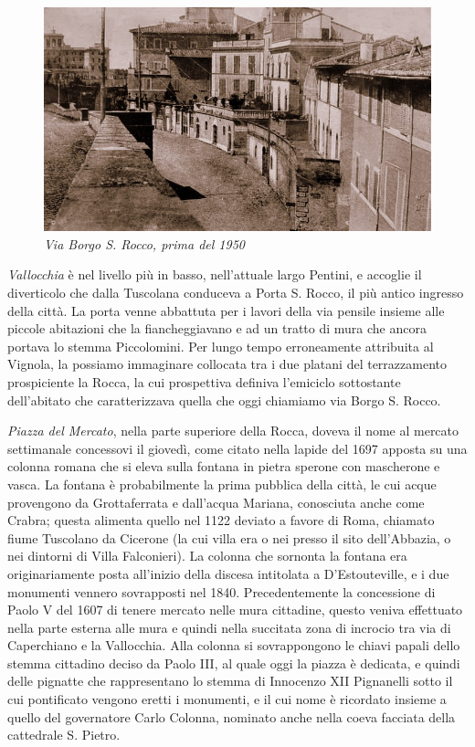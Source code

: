\documentclass[
  letterpaper,
  DIV=11,
  numbers=noendperiod]{scrartcl}
\begin{document}
\begin{figure}

{\centering \includegraphics{../../images/2024/san_rocco/9via-borgo-san-rocco.jpg}

}

\caption{\emph{Via Borgo S. Rocco, prima del 1950}}

\end{figure}

\emph{Vallocchia} è nel livello più in basso, nell'attuale largo
Pentini, e accoglie il diverticolo che dalla Tuscolana conduceva a Porta
S. Rocco, il più antico ingresso della città. La porta venne abbattuta
per i lavori della via pensile insieme alle piccole abitazioni che la
fiancheggiavano e ad un tratto di mura che ancora portava lo stemma
Piccolomini. Per lungo tempo erroneamente attribuita al Vignola, la
possiamo immaginare collocata tra i due platani del terrazzamento
prospiciente la Rocca, la cui prospettiva definiva l'emiciclo
sottostante dell'abitato che caratterizzava quella che oggi chiamiamo
via Borgo S. Rocco.

\emph{Piazza del Mercato}, nella parte superiore della Rocca, doveva il
nome al mercato settimanale concessovi il giovedì, come citato nella
lapide del 1697 apposta su una colonna romana che si eleva sulla fontana
in pietra sperone con mascherone e vasca. La fontana è probabilmente la
prima pubblica della città, le cui acque provengono da Grottaferrata e
dall'acqua Mariana, conosciuta anche come Crabra; questa alimenta quello
nel 1122 deviato a favore di Roma, chiamato fiume Tuscolano da Cicerone
(la cui villa era o nei presso il sito dell'Abbazia, o nei dintorni di
Villa Falconieri). La colonna che sornonta la fontana era
originariamente posta all'inizio della discesa intitolata a
D'Estouteville, e i due monumenti vennero sovrapposti nel 1840.
Precedentemente la concessione di Paolo V del 1607 di tenere mercato
nelle mura cittadine, questo veniva effettuato nella parte esterna alle
mura e quindi nella succitata zona di incrocio tra via di Caperchiano e
la Vallocchia. Alla colonna si sovrappongono le chiavi papali dello
stemma cittadino deciso da Paolo III, al quale oggi la piazza è
dedicata, e quindi delle pignatte che rappresentano lo stemma di
Innocenzo XII Pignanelli sotto il cui pontificato vengono eretti i
monumenti, e il cui nome è ricordato insieme a quello del governatore
Carlo Colonna, nominato anche nella coeva facciata della cattedrale S.
Pietro.
\end{document}
